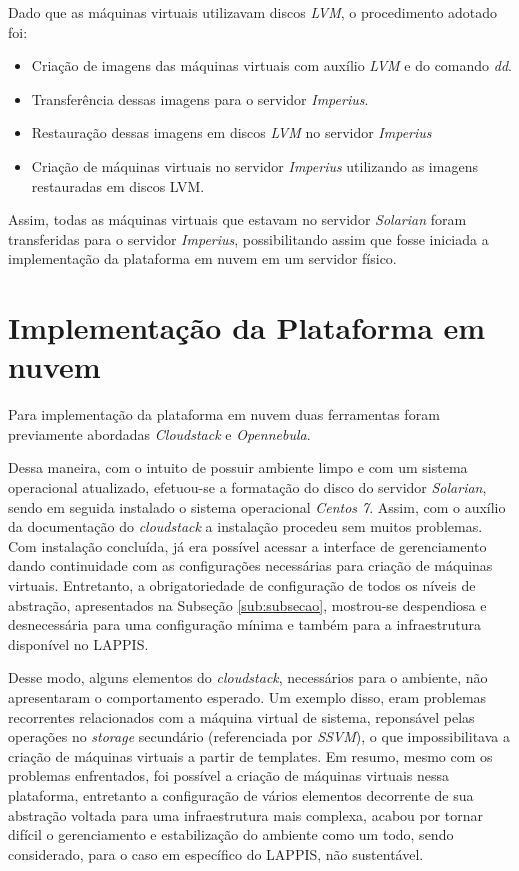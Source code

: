 \begin{apendicesenv}
Dado que as máquinas virtuais utilizavam discos \textit{LVM}, o procedimento adotado foi:
\begin{itemize}
  \item Criação de imagens das máquinas virtuais com auxílio  \textit{LVM} e do comando \textit{dd}.
  \item Transferência dessas imagens para o servidor \textit{Imperius}.
  \item Restauração dessas imagens em discos \textit{LVM} no servidor \textit{Imperius}
  \item Criação de máquinas virtuais no servidor \textit{Imperius} utilizando as imagens restauradas em discos LVM.
  
\end{itemize}

Assim, todas as máquinas virtuais que estavam no servidor \textit{Solarian} foram transferidas para o servidor \textit{Imperius}, possibilitando assim que fosse iniciada a implementação da plataforma em nuvem em um servidor físico.


\section{Implementação da Plataforma em nuvem}
Para implementação da plataforma em nuvem duas ferramentas foram previamente abordadas \textit{Cloudstack} e \textit{Opennebula}. 

Dessa maneira, com o intuito de possuir ambiente limpo e com um sistema operacional atualizado, efetuou-se a formatação do disco do servidor \textit{Solarian}, sendo em seguida instalado o sistema operacional \textit{Centos 7}. Assim, com o auxílio da documentação do \textit{cloudstack} a instalação procedeu sem muitos problemas. Com instalação concluída, já era possível acessar a interface de gerenciamento dando continuidade com as configurações necessárias para criação de máquinas virtuais. Entretanto, a obrigatoriedade de configuração de todos os níveis de abstração, apresentados na Subseção \ref{sub:subsecao}, mostrou-se despendiosa e desnecessária para uma configuração mínima e também para a infraestrutura disponível no LAPPIS.

Desse modo, alguns elementos do \textit{cloudstack}, necessários para o ambiente, não apresentaram o comportamento esperado. Um exemplo disso, eram problemas recorrentes relacionados com a máquina virtual de sistema, reponsável pelas operações no \textit{storage} secundário (referenciada por \textit{SSVM}), o que impossibilitava a criação de máquinas virtuais a partir de templates. Em resumo, mesmo com os problemas enfrentados, foi possível a criação de máquinas virtuais nessa plataforma, entretanto a configuração de vários elementos decorrente de sua abstração voltada para uma infraestrutura mais complexa, acabou por tornar difícil o gerenciamento e estabilização do ambiente como um todo, sendo considerado, para o caso em específico do LAPPIS, não sustentável.


\end{apendicesenv}
